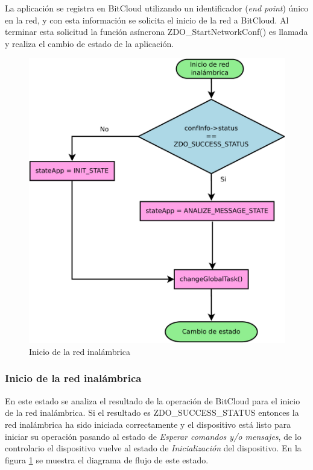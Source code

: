 La aplicación se registra en BitCloud utilizando un identificador (\textit{end point}) único en la red, y con esta información se solicita el inicio de la red a BitCloud. Al terminar esta solicitud la función asíncrona ZDO\_StartNetworkConf() es llamada y realiza el cambio de estado de la aplicación. 

\begin{figure}
	\centering
	\includegraphics[scale=0.35]{capitulo_3_imgs/inicio_red.pdf}
	\caption{Inicio de la red inalámbrica}
	\label{fig:diagrama_inicio_red}
\end{figure}

\subsubsection{Inicio de la red inalámbrica}

En este estado se analiza el resultado de la operación de BitCloud para el inicio de la red inalámbrica. Si el resultado es ZDO\_SUCCESS\_STATUS entonces la red inalámbrica ha sido iniciada correctamente y el dispositivo está listo para iniciar su operación pasando al estado de \textit{Esperar comandos y/o mensajes}, de lo controlario el dispositivo vuelve al estado de \textit{Inicialización} del dispositivo. En la figura \ref{fig:diagrama_inicio_red} se muestra el diagrama de flujo de este estado.

